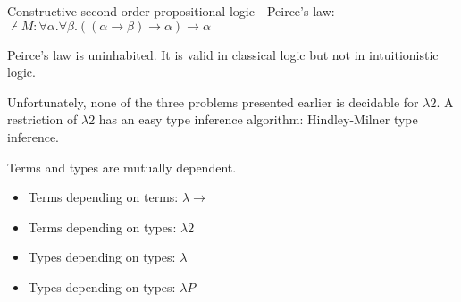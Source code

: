 Constructive second order propositional logic - Peirce's law: 
$\not\vdash M : \forall \alpha. \forall \beta. ((\alpha \to \beta) \to \alpha) \to \alpha$

Peirce's law is uninhabited. It is valid in classical logic but not in intuitionistic logic.

Unfortunately, none of the three problems presented earlier is decidable for $\lambda 2$. A restriction of $\lambda 2$ has
an easy type inference algorithm: Hindley-Milner type inference.

Terms and types are mutually dependent.
\begin{itemize}
\item Terms depending on terms: $\lambda \to$
\item Terms depending on types: $\lambda 2$
\item Types depending on types: $\lambda$ \underbar{$\omega$}
\item Types depending on types: $\lambda P$
\end{itemize}



